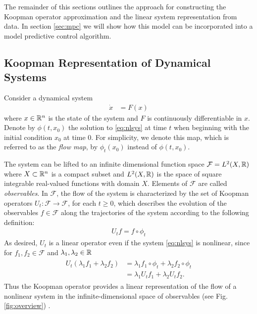 The remainder of this sections outlines the approach for constructing the Koopman operator approximation and the linear system representation from data.
In section \ref{sec:mpc} we will show how this model can be incorporated into a model predictive control algorithm.

\subsection{Koopman Representation of Dynamical Systems}

Consider a dynamical system
\begin{align}
    \dot{x} &= F (x)    \label{eq:nlsys}
\end{align}
where $x \in \mathbb{R}^n$ is the state of the system and ${F}$ is continuously differentiable in $x$.
Denote by $\phi(t,x_0)$ the solution to \eqref{eq:nlsys} at time $t$ when beginning with the initial condition $x_0$ at time $0$.
For simplicity, we denote this map, which is referred to as the \emph{flow map}, by $\phi_t (x_0)$ instead of $\phi (t, x_0)$.

The system can be lifted to an infinite dimensional function space $\mathcal{F} = L^2(X, \mathbb{R})$ where $X \subset \mathbb{R}^n$ is a compact subset and $L^2(X , \mathbb{R})$ is the space of square integrable real-valued functions with domain $X$.
Elements of $\mathcal{F}$ are called \emph{observables}.
In $\mathcal{F}$, the flow of the system is characterized by the set %
of Koopman operators 
$U_t : \mathcal{F} \to \mathcal{F}$, for each $t \geq 0$,
which describes the evolution of the observables ${f \in \mathcal{F}}$ along the trajectories of the system according to the following definition:
\begin{align}
    U_t f = f \circ \phi_t      
    \label{eq:koopman}
\end{align}
As desired, $U_t$ is a linear operator even if the system \eqref{eq:nlsys} is nonlinear, since for $f_1, f_2 \in \mathcal{F}$ and $\lambda_1, \lambda_2 \in \mathbb{R}$
\begin{align}
    \begin{split}
    U_t (\lambda_1 f_1 + \lambda_2 f_2) &= \lambda_1 f_1 \circ \phi_t + \lambda_2 f_2 \circ \phi_t \\
    &= \lambda_1 U_t f_1 + \lambda_2 U_t f_2.
    \end{split}
\end{align}
Thus the Koopman operator provides a linear representation of the flow of a nonlinear system in the infinite-dimensional space of observables (see Fig. \ref{fig:overview}) \cite{budivsic2012applied}.


